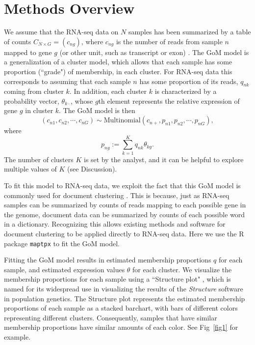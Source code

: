 \documentclass[10pt,letterpaper]{article}
\begin{document}

\section*{Methods Overview}

We assume that the RNA-seq data on $N$ samples has been summarized by a table of counts $C_{N \times G} = (c_{ng})$,
where $c_{ng}$ is the number of reads from sample $n$ mapped to gene $g$ (or other unit, such as transcript or exon) \cite{Oshlack2010}.
The GoM model is a generalization of a cluster model, which allows that each sample has some proportion (``grade") of membership,
in each cluster.  For RNA-seq data this corresponds to
assuming that each sample $n$ has some proportion of its reads, $q_{nk}$ coming from cluster $k$.
In addition, each cluster $k$ is characterized by a probability vector, $\theta_{k\cdot}$, whose $g$th element represents
the relative expression of gene $g$ in cluster $k$.
The GoM model is then
\begin{equation} \label{eqn:mult}
\left ( c_{n1}, c_{n2}, \cdots, c_{nG} \right) \sim \text{Multinomial} \left(c_{n+}, p_{n1}, p_{n2}, \cdots, p_{nG} \right),
\end{equation}
where
\begin{equation} \label{eqn:gom}
p_{ng} := \sum_{k=1}^{K} q_{nk}\theta_{kg}.
\end{equation}
The number of clusters $K$ is set by the analyst, and it can be helpful to explore multiple
values of $K$ (see Discussion).

To fit this model to RNA-seq data, we exploit the fact that this GoM model is commonly used for document clustering \cite{Blei2003}.
This is because, just as RNA-seq samples can be summarized by counts of reads mapping to each possible gene in the genome,
document data can be summarized by counts of each possible word in a dictionary.
Recognizing this allows existing methods and software for document clustering to be applied directly to RNA-seq data. Here we use the R package {\tt maptpx} \cite{Taddy2012} to fit the GoM model.

Fitting the GoM model results in estimated membership proportions $q$ for each sample, and estimated expression values $\theta$ for each cluster. We visualize the membership proportions for each sample using a ``Structure plot" \cite{Rosenberg2002},
which is named for its widespread use in visualizing the results of the {\it Structure} software \cite{Pritchard2000} in population genetics.
The Structure plot represents the estimated membership proportions of each sample
as a stacked barchart, with bars of different colors representing  different clusters. Consequently, samples that have similar membership proportions have similar amounts of each color. See Fig~\ref{fig1} for example.
\end{document}
